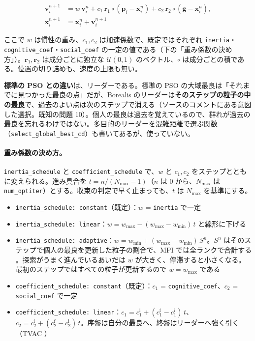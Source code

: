 \documentclass[11pt,a4paper,dvipdfmx]{jsarticle}
\begin{document}
\begin{align}
  \mathbf{v}_i^{n+1} &= w\,\mathbf{v}_i^{n} + c_1\,\mathbf{r}_1 \circ (\mathbf{p}_i - \mathbf{x}_i^{n}) + c_2\,\mathbf{r}_2 \circ (\mathbf{g} - \mathbf{x}_i^{n}), \\
  \mathbf{x}_i^{n+1} &= \mathbf{x}_i^{n} + \mathbf{v}_i^{n+1}
\end{align}

ここで $w$ は慣性の重み、$c_1, c_2$ は加速係数で、既定ではそれぞれ \texttt{inertia}・\texttt{cognitive\_coef}・\texttt{social\_coef} の一定の値である（下の「重み係数の決め方」）。$\mathbf{r}_1, \mathbf{r}_2$ は成分ごとに独立な $\mathcal{U}(0,1)$ のベクトル、$\circ$ は成分ごとの積である。位置の切り詰めも、速度の上限も無い。

\textbf{標準の PSO との違い}は、リーダーである。標準の PSO の大域最良は「それまでに見つかった最良の点」だが、Borealis のリーダーは\textbf{そのステップの粒子の中の最良}で、過去のよい点は次のステップで消える（ソースのコメントにある意図した選択。既知の問題 10）。個人の最良は過去を覚えているので、群れが過去の最良を忘れるわけではない。多目的のリーダーを混雑距離で選ぶ関数（\texttt{select\_global\_best\_cd}）も書いてあるが、使っていない。

\paragraph{重み係数の決め方。} \texttt{inertia\_schedule} と \texttt{coefficient\_schedule} で、$w$ と $c_1, c_2$ をステップとともに変えられる。進み具合を $t = n / (N_{\max} - 1)$（$n$ は 0 から、$N_{\max}$ は \texttt{num\_optiter}）とする。収束の判定で早く止まっても、$t$ は $N_{\max}$ を基準にする。

\begin{itemize}
\item \texttt{inertia\_schedule: constant}（既定）：$w$ = \texttt{inertia} で一定
\item \texttt{inertia\_schedule: linear}：$w = w_{\max} - (w_{\max} - w_{\min})\,t$ と線形に下げる \cite{shi1999}
\item \texttt{inertia\_schedule: adaptive}：$w = w_{\min} + (w_{\max} - w_{\min})\,S^n$。$S^n$ はそのステップで個人の最良を更新した粒子の割合で、MPI では全ランクで合計する \cite{nickabadi2011}。探索がうまく進んでいるあいだは $w$ が大きく、停滞すると小さくなる。最初のステップではすべての粒子が更新するので $w = w_{\max}$ である
\item \texttt{coefficient\_schedule: constant}（既定）：$c_1$ = \texttt{cognitive\_coef}、$c_2$ = \texttt{social\_coef} で一定
\item \texttt{coefficient\_schedule: linear}：$c_1 = c_1^{\mathrm{i}} + (c_1^{\mathrm{f}} - c_1^{\mathrm{i}})\,t$、$c_2 = c_2^{\mathrm{i}} + (c_2^{\mathrm{f}} - c_2^{\mathrm{i}})\,t$。序盤は自分の最良へ、終盤はリーダーへ強く引く（TVAC \cite{ratnaweera2004}）
\end{itemize}
\end{document}
